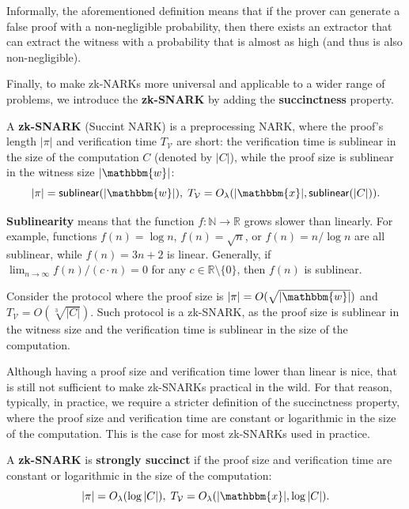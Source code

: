 \documentclass[../lecture-notes-148x210.tex]{subfiles}
\begin{document}
\begin{remark}
    Informally, the aforementioned definition means that if the prover can
    generate a false proof with a non-negligible probability, then there exists
    an extractor that can extract the witness with a probability that is almost
    as high (and thus is also non-negligible).
\end{remark}

Finally, to make zk-NARKs more universal and applicable to a wider range of
problems, we introduce the \textbf{zk-SNARK} by adding the \textbf{succinctness}
property.

\begin{definition}
    A \textbf{zk-SNARK} (Succint NARK) is a preprocessing NARK, where the
    proof's length $|\pi|$ and verification time $T_{\mathcal{V}}$ are short:
    the verification time is sublinear in the size of the computation $C$
    (denoted by $|C|$), while the proof size is sublinear in the witness size
    $|\mathbbm{w}|$:
    \begin{equation*}
        |\pi| = \mathsf{sublinear}(|\mathbbm{w}|), \; T_{\mathcal{V}} = O_{\lambda}(|\mathbbm{x}|, \mathsf{sublinear}(|C|)).
    \end{equation*}
\end{definition}

\begin{remark}
    \textbf{Sublinearity} means that the function $f: \mathbb{N} \to \mathbb{R}$
    grows slower than linearly. For example, functions $f(n) = \log n$, $f(n) =
    \sqrt{n}$, or $f(n)=n/\log n$ are all sublinear, while $f(n) = 3n+2$ is
    linear. Generally, if $\lim_{n \to \infty}f(n)/(c \cdot n) = 0$ for any $c
    \in \mathbb{R}\setminus \{0\}$, then $f(n)$ is sublinear.
\end{remark}

\begin{example}
    Consider the protocol where the proof size is $|\pi| = O(\sqrt{|\mathbbm{w}|})$ and
    $T_{\mathcal{V}} = O(\sqrt[3]{|C|})$. Such protocol is a zk-SNARK, as the
    proof size is sublinear in the witness size and the verification time is
    sublinear in the size of the computation.
\end{example}

Although having a proof size and verification time lower than linear is nice,
that is still not sufficient to make zk-SNARKs practical in the wild. For that
reason, typically, in practice, we require a stricter definition of the
succinctness property, where the proof size and verification time are constant
or logarithmic in the size of the computation. This is the case for most
zk-SNARKs used in practice.
\begin{definition}
    A \textbf{zk-SNARK} is \textbf{strongly succinct} if the proof size and
    verification time are constant or logarithmic in the size of the
    computation:
    \begin{equation*}
        |\pi| = O_{\lambda}(\log |C|), \; T_{\mathcal{V}} = O_{\lambda}(|\mathbbm{x}|, \log|C|).
    \end{equation*}
\end{definition}
\end{document}
